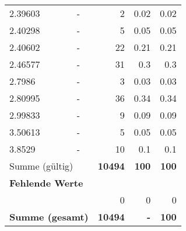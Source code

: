 \begin{longtable}{lXrrr}
        2.39603 & \multicolumn{1}{X}{-} & %
          \num{2} &
          \num[round-mode=places,round-precision=2]{0,02} &
          \num[round-mode=places,round-precision=2]{0,02} \\

        2.40298 & \multicolumn{1}{X}{-} & %
          \num{5} &
          \num[round-mode=places,round-precision=2]{0,05} &
          \num[round-mode=places,round-precision=2]{0,05} \\

        2.40602 & \multicolumn{1}{X}{-} & %
          \num{22} &
          \num[round-mode=places,round-precision=2]{0,21} &
          \num[round-mode=places,round-precision=2]{0,21} \\

        2.46577 & \multicolumn{1}{X}{-} & %
          \num{31} &
          \num[round-mode=places,round-precision=2]{0,3} &
          \num[round-mode=places,round-precision=2]{0,3} \\

        2.7986 & \multicolumn{1}{X}{-} & %
          \num{3} &
          \num[round-mode=places,round-precision=2]{0,03} &
          \num[round-mode=places,round-precision=2]{0,03} \\

        2.80995 & \multicolumn{1}{X}{-} & %
          \num{36} &
          \num[round-mode=places,round-precision=2]{0,34} &
          \num[round-mode=places,round-precision=2]{0,34} \\

        2.99833 & \multicolumn{1}{X}{-} & %
          \num{9} &
          \num[round-mode=places,round-precision=2]{0,09} &
          \num[round-mode=places,round-precision=2]{0,09} \\

        3.50613 & \multicolumn{1}{X}{-} & %
          \num{5} &
          \num[round-mode=places,round-precision=2]{0,05} &
          \num[round-mode=places,round-precision=2]{0,05} \\

        3.8529 & \multicolumn{1}{X}{-} & %
          \num{10} &
          \num[round-mode=places,round-precision=2]{0,1} &
          \num[round-mode=places,round-precision=2]{0,1} \\

     \midrule
     \multicolumn{2}{l}{Summe (gültig)} &
       \textbf{\num{10494}} &
     \textbf{100} &
       \textbf{\num[round-mode=places,round-precision=2]{100}} \\
     \multicolumn{5}{l}{\textbf{Fehlende Werte}}\\
      & & 0 & 0 & 0 \\
     \midrule
     \multicolumn{2}{l}{\textbf{Summe (gesamt)}} &
          \textbf{\num{10494}} &
        \textbf{-} &
        \textbf{100} \\
     \bottomrule
     \end{longtable}
     
